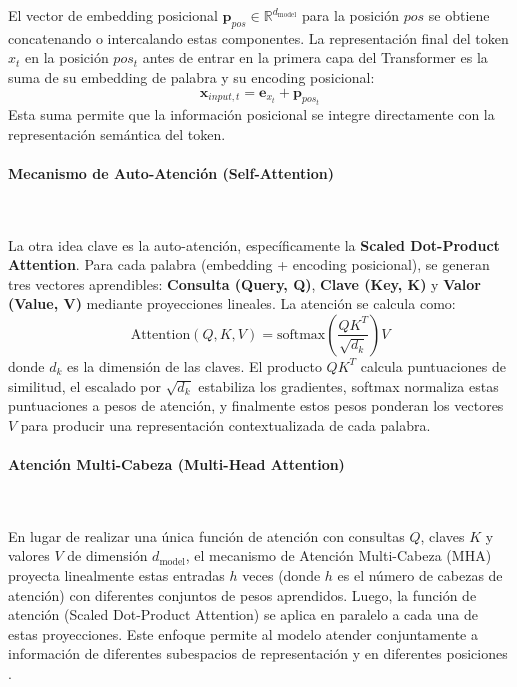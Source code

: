 El vector de embedding posicional $\mathbf{p}_{pos} \in \mathbb{R}^{d_{\text{model}}}$ para la posición $pos$ se obtiene concatenando o intercalando estas componentes. La representación final del token $x_t$ en la posición $pos_t$ antes de entrar en la primera capa del Transformer es la suma de su embedding de palabra y su encoding posicional:
\begin{equation}
\mathbf{x}_{input, t} = \mathbf{e}_{x_t} + \mathbf{p}_{pos_t}
\label{eq:input_representation}
\end{equation}
Esta suma permite que la información posicional se integre directamente con la representación semántica del token.

\paragraph{Mecanismo de Auto-Atención (Self-Attention)} \

La otra idea clave es la auto-atención, específicamente la \textbf{Scaled Dot-Product Attention}. Para cada palabra (embedding + encoding posicional), se generan tres vectores aprendibles: \textbf{Consulta (Query, Q)}, \textbf{Clave (Key, K)} y \textbf{Valor (Value, V)} mediante proyecciones lineales. La atención se calcula como:
\begin{equation}
    \text{Attention}(Q, K, V) = \text{softmax}\left(\frac{QK^T}{\sqrt{d_k}}\right)V
    \label{eq:scaled_dot_product_attention_main}
\end{equation}
donde $d_k$ es la dimensión de las claves. El producto $QK^T$ calcula puntuaciones de similitud, el escalado por $\sqrt{d_k}$ estabiliza los gradientes, softmax normaliza estas puntuaciones a pesos de atención, y finalmente estos pesos ponderan los vectores $V$ para producir una representación contextualizada de cada palabra.

\paragraph{Atención Multi-Cabeza (Multi-Head Attention)} \

En lugar de realizar una única función de atención con consultas $Q$, claves $K$ y valores $V$ de dimensión $d_{\text{model}}$, el mecanismo de Atención Multi-Cabeza (MHA) proyecta linealmente estas entradas $h$ veces (donde $h$ es el número de cabezas de atención) con diferentes conjuntos de pesos aprendidos. Luego, la función de atención (Scaled Dot-Product Attention) se aplica en paralelo a cada una de estas proyecciones. Este enfoque permite al modelo atender conjuntamente a información de diferentes subespacios de representación y en diferentes posiciones \citep{Vaswani2017}.


